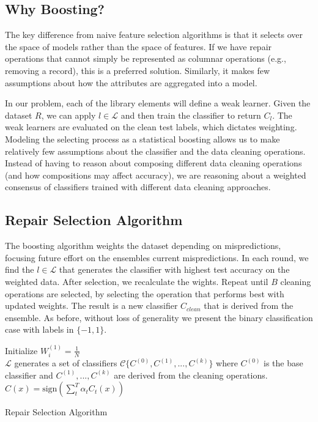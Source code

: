 \subsection{Why Boosting?}
The key difference from naive feature selection algorithms is that it selects over the space of models rather than the space of features.
If we have repair operations that cannot simply be represented as columnar operations (e.g., removing a record), this is a preferred solution.
Similarly, it makes few assumptions about how the attributes are aggregated into a model.

In our problem, each of the library elements will define a weak learner.
Given the dataset $R$, we can apply $l \in \mathcal{L}$ and then train the classifier to return $C_l$. 
The weak learners are evaluated on the clean test labels, which dictates weighting.
Modeling the selecting process as a statistical boosting allows us to make relatively few assumptions about the classifier and the data cleaning operations. 
Instead of having to reason about composing different data cleaning operations (and how compositions may affect accuracy), we are reasoning about a weighted consensus of classifiers trained with different data cleaning approaches.

\subsection{Repair Selection Algorithm}\label{s:boostalg}
The boosting algorithm weights the dataset depending on mispredictions, focusing future effort on the ensembles current mispredictions.
In each round, we find the $l \in \mathcal{L}$ that generates the classifier with highest test accuracy on the weighted data.
After selection, we recalculate the wights.
Repeat until $B$ cleaning operations are selected, by selecting the operation that performs best with updated weights.
The result is a new classifier $C_{clean}$ that is derived from the ensemble.
As before, without loss of generality we present the binary classification case with labels in $\{-1,1\}$.

\begin{algorithm}
Initialize $W^{(1)}_i = \frac{1}{N}$\\

$\mathcal{L}$ generates a set of classifiers $\mathcal{C} \{C^{(0)}, C^{(1)},...,C^{(k)}\}$ where $C^{(0)}$ is the base classifier and $C^{(1)},...,C^{(k)}$ are derived from the cleaning operations.\\

\Return $C(x) = \text{sign}(\sum_t^T \alpha_t C_t(x) )$
\caption{Repair Selection Algorithm}
\label{alg:rsa}
\end{algorithm}


